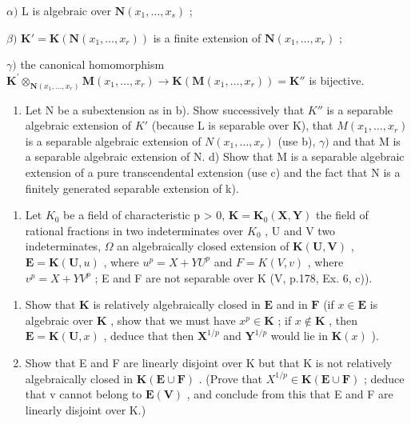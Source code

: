 \(\alpha)\) L is algebraic over \(\mathbf{N}(x_1,\dots,x_s)\) ;

\(\beta)\) \(\mathbf{K}' = \mathbf{K}(\mathbf{N}(x_1,\dots,x_r))\) is a finite extension of \(\mathbf{N}(x_1,\dots,x_r)\) ;

\(\gamma)\) the canonical homomorphism \(\mathbf{K}^{\prime}\otimes_{\mathbf{N}(x_1,\ldots ,x_r)}\mathbf{M}(x_1,\dots,x_r)\to \mathbf{K}(\mathbf{M}(x_1,\dots,x_r)) = \mathbf{K}''\) is bijective.

\begin{enumerate}
\def\labelenumi{\alph{enumi})}
\setcounter{enumi}{2}
\tightlist
\item
  Let N be a subextension as in b). Show successively that \(K''\) is a separable algebraic extension of \(K'\) (because L is separable over K), that \(M(x_{1}, \ldots, x_{r})\) is a separable algebraic extension of \(N(x_{1}, \ldots, x_{r})\) (use b), \(\gamma)\) and that M is a separable algebraic extension of N. d) Show that M is a separable algebraic extension of a pure transcendental extension (use c) and the fact that N is a finitely generated separable extension of k).
\end{enumerate}

\BourbakiExerciseGroup

\begin{enumerate}
\def\labelenumi{\arabic{enumi})}
\tightlist
\item
  Let \(K_{0}\) be a field of characteristic p \textgreater{} 0, \(\mathbf{K} = \mathbf{K}_{0}(\mathbf{X}, \mathbf{Y})\) the field of rational fractions in two indeterminates over \(K_{0}\) , U and V two indeterminates, \(\Omega\) an algebraically closed extension of \(\mathbf{K}(\mathbf{U}, \mathbf{V})\) , \(\mathbf{E} = \mathbf{K}(\mathbf{U}, u)\) , where \(u^{p} = X + YU^{p}\) and \(F = K(V, v)\) , where \(v^{p} = X + YV^{p}\) ; E and F are not separable over K (V, p.178, Ex. 6, c)).
\end{enumerate}

\begin{enumerate}
\def\labelenumi{\alph{enumi})}
\item
  Show that \(\mathbf{K}\) is relatively algebraically closed in \(\mathbf{E}\) and in \(\mathbf{F}\) (if \(x \in \mathbf{E}\) is algebraic over \(\mathbf{K}\) , show that we must have \(x^p \in \mathbf{K}\) ; if \(x \notin \mathbf{K}\) , then \(\mathbf{E} = \mathbf{K}(\mathbf{U}, x)\) , deduce that then \(\mathbf{X}^{1/p}\) and \(\mathbf{Y}^{1/p}\) would lie in \(\mathbf{K}(x)\) ).
\item
  Show that E and F are linearly disjoint over K but that K is not relatively algebraically closed in \(\mathbf{K}(\mathbf{E} \cup \mathbf{F})\) . (Prove that \(X^{1/p} \in \mathbf{K}(\mathbf{E} \cup \mathbf{F})\) ; deduce that v cannot belong to \(\mathbf{E}(\mathbf{V})\) , and conclude from this that E and F are linearly disjoint over K.)
\end{enumerate}


